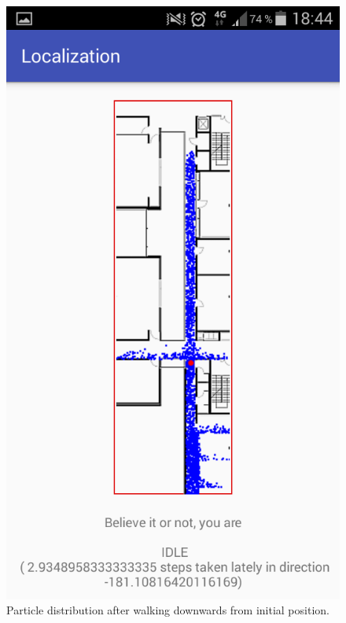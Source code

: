 \documentclass[conference]{IEEEtran}
\begin{document}
\begin{figure}[!htp]
\begin{center}
\includegraphics[width=0.7\linewidth]{fig/down}
\caption{Particle distribution after walking downwards from initial position.}\label{fig:down}
\end{center}
\end{figure}
\end{document}
